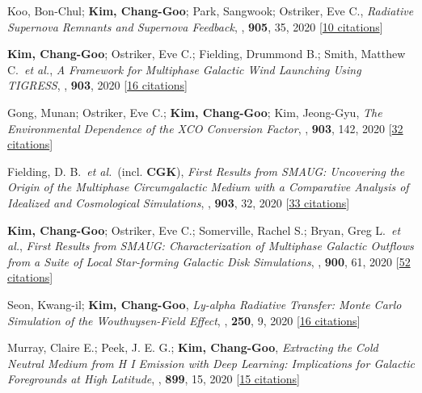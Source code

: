 \item[{29.}]Koo, Bon-Chul; \textbf{Kim, Chang-Goo}; Park, Sangwook; Ostriker, Eve C., \textit{Radiative Supernova Remnants and Supernova Feedback}, , \textbf{905}, 35, 2020 [\href{http://adsabs.harvard.edu/abs/2020ApJ...905...35K}{10 citations}]

\item[{28.}]\textbf{Kim, Chang-Goo}; Ostriker, Eve C.; Fielding, Drummond B.; Smith, Matthew C.~\textit{et al.}, \textit{A Framework for Multiphase Galactic Wind Launching Using TIGRESS}, , \textbf{903}, 2020 [\href{http://adsabs.harvard.edu/abs/2020ApJ...903L..34K}{16 citations}]

\item[{27.}]Gong, Munan; Ostriker, Eve C.; \textbf{Kim, Chang-Goo}; Kim, Jeong-Gyu, \textit{The Environmental Dependence of the XCO Conversion Factor}, , \textbf{903}, 142, 2020 [\href{http://adsabs.harvard.edu/abs/2020ApJ...903..142G}{32 citations}]

\item[{26.}]Fielding, D. B.~\textit{et al.}~(incl. \textbf{CGK}), \textit{First Results from SMAUG: Uncovering the Origin of the Multiphase Circumgalactic Medium with a Comparative Analysis of Idealized and Cosmological Simulations}, , \textbf{903}, 32, 2020 [\href{http://adsabs.harvard.edu/abs/2020ApJ...903...32F}{33 citations}]

\item[{25.}]\textbf{Kim, Chang-Goo}; Ostriker, Eve C.; Somerville, Rachel S.; Bryan, Greg L.~\textit{et al.}, \textit{First Results from SMAUG: Characterization of Multiphase Galactic Outflows from a Suite of Local Star-forming Galactic Disk Simulations}, , \textbf{900}, 61, 2020 [\href{http://adsabs.harvard.edu/abs/2020ApJ...900...61K}{52 citations}]

\item[{24.}]Seon, Kwang-il; \textbf{Kim, Chang-Goo}, \textit{Ly-alpha Radiative Transfer: Monte Carlo Simulation of the Wouthuysen-Field Effect}, , \textbf{250}, 9, 2020 [\href{http://adsabs.harvard.edu/abs/2020ApJS..250....9S}{16 citations}]

\item[{23.}]Murray, Claire E.; Peek, J. E. G.; \textbf{Kim, Chang-Goo}, \textit{Extracting the Cold Neutral Medium from H I Emission with Deep Learning: Implications for Galactic Foregrounds at High Latitude}, , \textbf{899}, 15, 2020 [\href{http://adsabs.harvard.edu/abs/2020ApJ...899...15M}{15 citations}]

